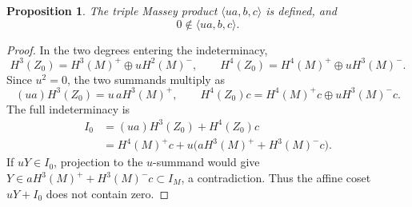 \documentclass[11pt]{article}
\newtheorem{proposition}[theorem]{Proposition}
\theoremstyle{remark}\newtheorem{remark}[theorem]{Remark}
\begin{document}
\begin{proposition}\label{prop:quotient-Massey}
The triple Massey product $\langle ua,b,c\rangle$ is defined, and
\begin{equation}\label{eq:quotient-nonzero}0\notin\langle ua,b,c\rangle.\end{equation}
\end{proposition}
\begin{proof}
In the two degrees entering the indeterminacy,
\[
H^3(Z_0)=H^3(M)^+\oplus uH^2(M)^-,\qquad
H^4(Z_0)=H^4(M)^+\oplus uH^3(M)^-.
\]
Since $u^2=0$, the two summands multiply as
\[
(ua)H^3(Z_0)=u\,aH^3(M)^+,\qquad
H^4(Z_0)c=H^4(M)^+c\oplus uH^3(M)^-c.
\]
The full indeterminacy is
\begin{align}
I_0&=(ua)H^3(Z_0)+H^4(Z_0)c\label{eq:I0-first}\\
&=H^4(M)^+c+u\bigl(aH^3(M)^++H^3(M)^-c\bigr).\label{eq:I0-decomp}
\end{align}
If $uY\in I_0$, projection to the $u$-summand would give
$Y\in aH^3(M)^++H^3(M)^-c\subset I_M$, a contradiction.  Thus the affine
coset $uY+I_0$ does not contain zero.
\end{proof}
\end{document}
